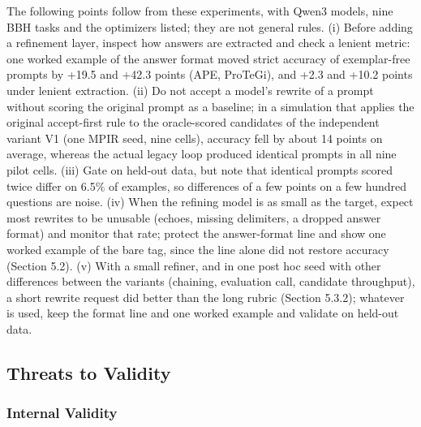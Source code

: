 \documentclass{ieeeaccess}
\begin{document}
The following points follow from these experiments, with Qwen3 models, nine BBH tasks and the optimizers listed; they are not general rules. (i) Before adding a refinement layer, inspect how answers are extracted and check a lenient metric: one worked example of the answer format moved strict accuracy of exemplar-free prompts by +19.5 and +42.3 points (APE, ProTeGi), and +2.3 and +10.2 points under lenient extraction. (ii) Do not accept a model's rewrite of a prompt without scoring the original prompt as a baseline; in a simulation that applies the original accept-first rule to the oracle-scored candidates of the independent variant V1 (one MPIR seed, nine cells), accuracy fell by about 14 points on average, whereas the actual legacy loop produced identical prompts in all nine pilot cells. (iii) Gate on held-out data, but note that identical prompts scored twice differ on 6.5\% of examples, so differences of a few points on a few hundred questions are noise. (iv) When the refining model is as small as the target, expect most rewrites to be unusable (echoes, missing delimiters, a dropped answer format) and monitor that rate; protect the answer-format line and show one worked example of the bare tag, since the line alone did not restore accuracy (Section 5.2). (v) With a small refiner, and in one post hoc seed with other differences between the variants (chaining, evaluation call, candidate throughput), a short rewrite request did better than the long rubric (Section 5.3.2); whatever is used, keep the format line and one worked example and validate on held-out data.

\subsection{Threats to Validity}

\subsubsection{Internal Validity}
\end{document}

